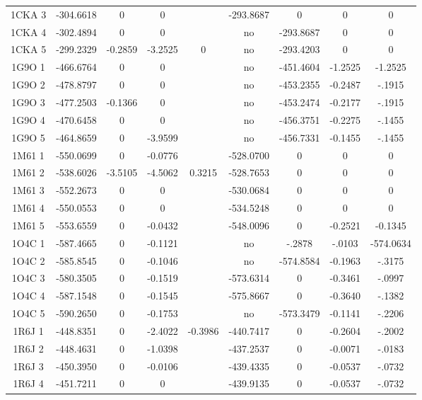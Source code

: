\documentclass[a4paper,12pt]{book}
\begin{document}
\begin{table}[h]
\begin{tabular}{|c|c|c|c|c|c|c|c|c|}
        1CKA 3 & -304.6618 & 0 & 0 & & -293.8687 & 0 & 0 & 0 \\ 
        1CKA 4 & -302.4894 & 0 & 0 & & no & -293.8687 & 0 & 0 \\ 
        1CKA 5 & -299.2329 & -0.2859 & -3.2525 & 0 & no & -293.4203 & 0 & 0 \\ 
        1G9O 1 & -466.6764 & 0 & 0 & & no & -451.4604 & -1.2525 & -1.2525 \\       
        1G9O 2 & -478.8797 & 0 & 0 & & no & -453.2355 & -0.2487 & -.1915 \\       
        1G9O 3 & -477.2503 & -0.1366 & 0 & & no & -453.2474 & -0.2177 & -.1915 \\       
        1G9O 4 & -470.6458 & 0 & 0 & & no & -456.3751 & -0.2275 & -.1455 \\       
        1G9O 5 & -464.8659 & 0 & -3.9599 & & no & -456.7331 & -0.1455 & -.1455 \\       
        1M61 1 & -550.0699 & 0 & -0.0776 & & -528.0700 & 0 & 0 & 0 \\ 
        1M61 2 & -538.6026 & -3.5105 & -4.5062 & 0.3215 & -528.7653 & 0 & 0 & 0 \\ 
        1M61 3 & -552.2673 & 0 & 0 & & -530.0684 & 0 & 0 & 0 \\ 
        1M61 4 & -550.0553 & 0 & 0 & & -534.5248 & 0 & 0 & 0 \\ 
        1M61 5 & -553.6559 & 0 & -0.0432 & & -548.0096 & 0 & -0.2521 & -0.1345 \\          
        1O4C 1 & -587.4665 & 0 & -0.1121 & & no & -.2878 & -.0103 & -574.0634 \\        
        1O4C 2 & -585.8545 & 0 & -0.1046 & & no & -574.8584 & -0.1963 & -.3175 \\       
        1O4C 3 & -580.3505 & 0 & -0.1519 & & -573.6314 & 0 & -0.3461 & -.0997 \\        
        1O4C 4 & -587.1548 & 0 & -0.1545 & & -575.8667 & 0 & -0.3640 & -.1382 \\        
        1O4C 5 & -590.2650 & 0 & -0.1753 & & no & -573.3479 & -0.1141 & -.2206 \\       
        1R6J 1 & -448.8351 & 0 & -2.4022 & -0.3986 & -440.7417 & 0 & -0.2604 & -.2002 \\        
        1R6J 2 & -448.4631 & 0 & -1.0398 & & -437.2537 & 0 & -0.0071 & -.0183 \\        
        1R6J 3 & -450.3950 & 0 & -0.0106 & & -439.4335 & 0 & -0.0537 & -.0732 \\        
        1R6J 4 & -451.7211 & 0 & 0 & & -439.9135 & 0 & -0.0537 & -.0732 \\        

\end{tabular}
\end{table}
\end{document}
